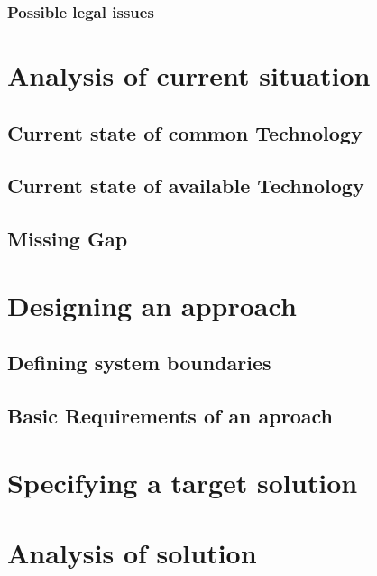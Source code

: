 \documentclass[11pt,a4paper]{book}
\begin{document}
\subsection{Possible legal issues}

\chapter{Analysis of current situation\label{chap:analysis}}
\section{Current state of common Technology}
\section{Current state of available Technology}
\section{Missing Gap}


\chapter{Designing an approach}
\section{Defining system boundaries}
\section{Basic Requirements of an aproach}

\chapter{Specifying a target solution}

\chapter{Analysis of solution}
\end{document}
